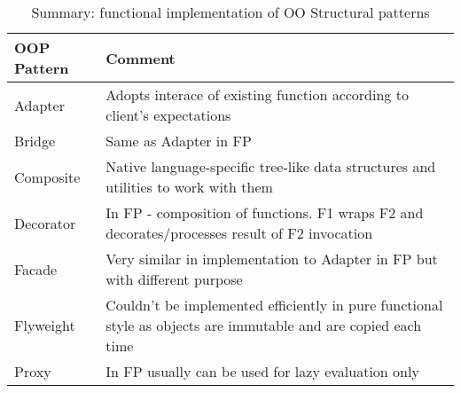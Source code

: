 \begin{table}
    \begin{tabular}{ | l | p{10cm} |}
        \hline
        \hline
        OOP Pattern & Comment \\
        \hline
        \hline
            \cellcolor{green} Adapter  & Adopts interace of existing function according to client's expectations \\ \hline
            \cellcolor{green} Bridge  &  Same as Adapter in FP \\ \hline
            \cellcolor{green} Composite  & Native language-specific tree-like data structures and utilities to work with them \\ \hline
            \cellcolor{green} Decorator  & In FP - composition of functions. F1 wraps F2 and decorates/processes result of F2 invocation\\ \hline
            \cellcolor{green} Facade  & Very similar in implementation to Adapter in FP but with different purpose \\ \hline
            \cellcolor{red} Flyweight  & Couldn't be implemented efficiently in pure functional style as objects are immutable and are copied each time\\ \hline
            \cellcolor{green} Proxy & In FP usually can be used for lazy evaluation only \\ \hline
        \hline
    \end{tabular}
    \caption{Summary: functional implementation of OO Structural patterns}
\end{table}

